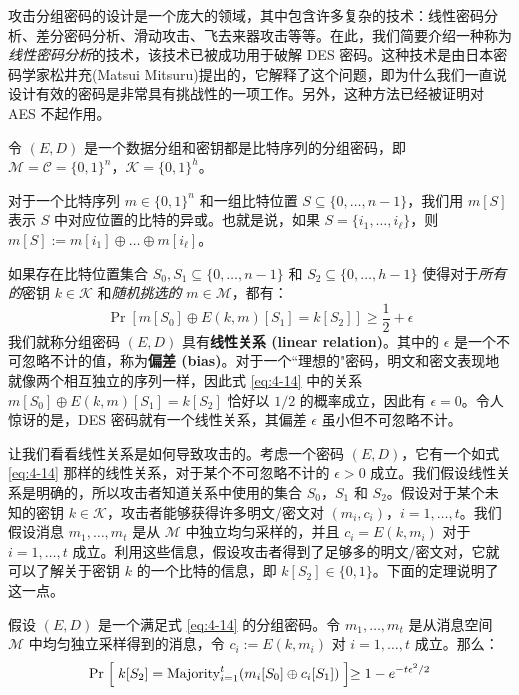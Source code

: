 攻击分组密码的设计是一个庞大的领域，其中包含许多复杂的技术：线性密码分析、差分密码分析、滑动攻击、飞去来器攻击等等。在此，我们简要介绍一种称为\emph{线性密码分析}的技术，该技术已被成功用于破解 DES 密码。这种技术是由日本密码学家松井充(Matsui Mitsuru)提出的，它解释了这个问题，即为什么我们一直说设计有效的密码是非常具有挑战性的一项工作。另外，这种方法已经被证明对 AES 不起作用。

\begin{snote}[线性密码分析。]
令 $(E,D)$ 是一个数据分组和密钥都是比特序列的分组密码，即 $\mathcal{M}=\mathcal{C}=\{0,1\}^n$，$\mathcal{K}=\{0,1\}^h$。

对于一个比特序列 $m\in\{0,1\}^n$ 和一组比特位置 $S\subseteq\{0,\dots,n-1\}$，我们用 $m[S]$ 表示 $S$ 中对应位置的比特的异或。也就是说，如果 $S=\{i_1,\dots,i_\ell\}$，则 $m[S]:=m[i_1]\oplus\dots\oplus m[i_\ell]$。

如果存在比特位置集合 $S_0,S_1\subseteq\{0,\dots,n-1\}$ 和 $S_2\subseteq\{0,\dots,h-1\}$ 使得对于\emph{所有的}密钥 $k\in\mathcal{K}$ 和\emph{随机挑选的} $m\in\mathcal{M}$，都有：
\begin{equation}\label{eq:4-14}
\Pr[m[S_0]\oplus E(k,m)[S_1]=k[S_2]]\geq\frac{1}{2}+\epsilon
\end{equation}
我们就称分组密码 $(E,D)$ 具有\textbf{线性关系 (linear relation)}。其中的 $\epsilon$ 是一个不可忽略不计的值，称为\textbf{偏差 (bias)}。对于一个``理想的"密码，明文和密文表现地就像两个相互独立的序列一样，因此式 \ref{eq:4-14} 中的关系 $m[S_0]\oplus E(k,m)[S_1]=k[S_2]$ 恰好以 $1/2$ 的概率成立，因此有 $\epsilon=0$。令人惊讶的是，DES 密码就有一个线性关系，其偏差 $\epsilon$ 虽小但不可忽略不计。

让我们看看线性关系是如何导致攻击的。考虑一个密码 $(E,D)$，它有一个如式 \ref{eq:4-14} 那样的线性关系，对于某个不可忽略不计的 $\epsilon>0$ 成立。我们假设线性关系是明确的，所以攻击者知道关系中使用的集合 $S_0$，$S_1$ 和 $S_2$。假设对于某个未知的密钥 $k\in\mathcal{K}$，攻击者能够获得许多明文/密文对 $(m_i,c_i)$，$i=1,\dots,t$。我们假设消息 $m_1,\dots,m_t$ 是从 $\mathcal{M}$ 中独立均匀采样的，并且 $c_i=E(k,m_i)$ 对于 $i=1,\dots,t$ 成立。利用这些信息，假设攻击者得到了足够多的明文/密文对，它就可以了解关于密钥 $k$ 的一个比特的信息，即 $k[S_2]\in\{0,1\}$。下面的定理说明了这一点。
\end{snote}

\begin{lemma}\label{lemma:4-3}
假设 $(E, D)$ 是一个满足式 \ref{eq:4-14} 的分组密码。令 $m_1,\dots,m_t$ 是从消息空间 $\mathcal{M}$ 中均匀独立采样得到的消息，令 $c_i:=E(k,m_i)$ 对 $i=1,\dots,t$ 成立。那么：
\begin{equation}\label{eq:4-15}
\Pr
\Bigm[
k[S_2]={\rm Majority}^t_{i=1}(m_i[S_0]\oplus c_i[S_1])
\Bigm]
\geq1-e^{-{t\epsilon^2}/{2}}
\end{equation}
\end{lemma}


